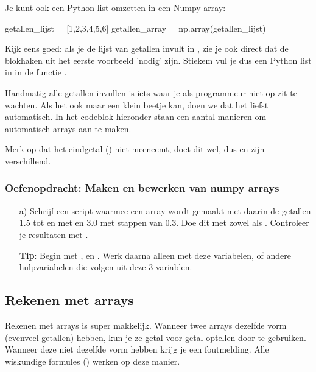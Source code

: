 \documentclass[a4paper,11pt, fleqn]{article}
\begin{document}
Je kunt ook een Python list omzetten in een Numpy array:
\begin{python}
getallen_lijst = [1,2,3,4,5,6]
getallen_array = np.array(getallen_lijst) 
\end{python}
Kijk eens goed: als je de lijst van getallen invult in , zie je ook direct dat de blokhaken uit het eerste voorbeeld 'nodig' zijn. Stiekem vul je dus een Python list in in de functie .

Handmatig alle getallen invullen is iets waar je als programmeur niet op zit te wachten. Als het ook maar een klein beetje kan, doen we dat het liefst automatisch. In het codeblok hieronder staan een aantal manieren om automatisch arrays aan te maken.


Merk op dat  het eindgetal () niet meeneemt,  doet dit wel, dus  en  zijn verschillend. 

\subsubsection*{Oefenopdracht: Maken en bewerken van numpy arrays}
\begin{itemize}
	\item[a)] Schrijf een script waarmee een array wordt gemaakt met daarin de getallen 1.5 tot en met en 3.0 met stappen van 0.3. Doe dit met zowel  als . Controleer je resultaten met .
	
	{\bf Tip}: Begin met ,  en . Werk daarna alleen met deze variabelen, of andere hulpvariabelen die volgen uit deze 3 variablen.
	
\end{itemize}

\subsection{Rekenen met arrays}
Rekenen met arrays is super makkelijk. Wanneer twee arrays dezelfde vorm (evenveel getallen) hebben, kun je ze getal voor getal optellen door \pythoninline{+} te gebruiken. Wanneer deze niet dezelfde vorm hebben krijg je een foutmelding. Alle wiskundige formules (\pythoninline{+,-,/,*,**}) werken op deze manier.
\end{document}
